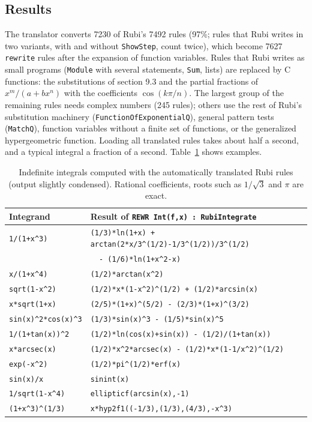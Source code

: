 \documentclass[11pt,a4paper]{article}
\begin{document}
\subsection{Results}

The translator converts 7230 of Rubi's 7492 rules (97\%; rules that Rubi
writes in two variants, with and without \texttt{ShowStep}, count twice),
which become 7627 \texttt{rewrite} rules after the expansion of function
variables. Rules that Rubi writes as small programs (\texttt{Module} with
several statements, \texttt{Sum}, lists) are replaced by C functions: the
substitutions of section 9.3 and the partial fractions of
$x^m/(a+bx^n)$ with the coefficients $\cos(k\pi/n)$. The
largest group of the remaining rules needs complex numbers (245 rules);
others use the rest of Rubi's substitution machinery
(\texttt{FunctionOfExponentialQ}), general pattern tests
(\texttt{MatchQ}), function variables without a finite set of functions,
or the generalized hypergeometric function. Loading all translated rules takes
about half a second, and a typical integral a fraction of a second.
Table~\ref{tab:int} shows examples.

\begin{table}[ht]
\centering
\small
\begin{tabular}{@{}ll@{}}
\toprule
Integrand & Result of \texttt{REWR Int(f,x) : RubiIntegrate} \\
\midrule
\texttt{1/(1+x\^{}3)} & \texttt{(1/3)*ln(1+x) + arctan(2*x/3\^{}(1/2)-1/3\^{}(1/2))/3\^{}(1/2)} \\
                      & \texttt{\ \ - (1/6)*ln(1+x\^{}2-x)} \\
\texttt{x/(1+x\^{}4)}  & \texttt{(1/2)*arctan(x\^{}2)} \\
\texttt{sqrt(1-x\^{}2)} & \texttt{(1/2)*x*(1-x\^{}2)\^{}(1/2) + (1/2)*arcsin(x)} \\
\texttt{x*sqrt(1+x)}  & \texttt{(2/5)*(1+x)\^{}(5/2) - (2/3)*(1+x)\^{}(3/2)} \\
\texttt{sin(x)\^{}2*cos(x)\^{}3} & \texttt{(1/3)*sin(x)\^{}3 - (1/5)*sin(x)\^{}5} \\
\texttt{1/(1+tan(x))\^{}2} & \texttt{(1/2)*ln(cos(x)+sin(x)) - (1/2)/(1+tan(x))} \\
\texttt{x*arcsec(x)} & \texttt{(1/2)*x\^{}2*arcsec(x) - (1/2)*x*(1-1/x\^{}2)\^{}(1/2)} \\
\texttt{exp(-x\^{}2)} & \texttt{(1/2)*pi\^{}(1/2)*erf(x)} \\
\texttt{sin(x)/x}     & \texttt{sinint(x)} \\
\texttt{1/sqrt(1-x\^{}4)} & \texttt{ellipticf(arcsin(x),-1)} \\
\texttt{(1+x\^{}3)\^{}(1/3)} & \texttt{x*hyp2f1((-1/3),(1/3),(4/3),-x\^{}3)} \\
\bottomrule
\end{tabular}
\caption{Indefinite integrals computed with the automatically translated
Rubi rules (output slightly condensed). Rational coefficients, roots
such as $1/\sqrt{3}$ and $\pi$ are exact.}
\label{tab:int}
\end{table}
\end{document}
